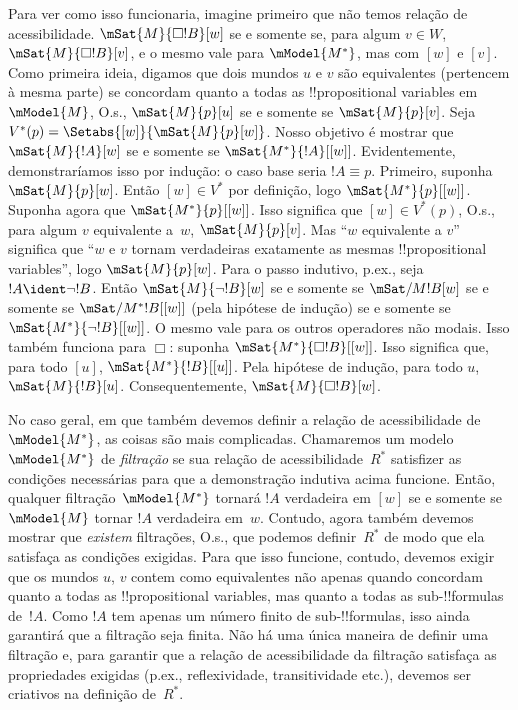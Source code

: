 \documentclass[../../../include/open-logic-section]{subfiles}
\begin{document}
Para ver como isso funcionaria, imagine primeiro que não temos relação
de acessibilidade. $\mSat{M}{\Box !B}[w]$ se e somente se, para algum
$v \in W$, $\mSat{M}{\Box !B}[v]$, e o mesmo vale para
$\mModel{M^*}$, mas com $[w]$ e $[v]$. Como primeira ideia, digamos que
dois mundos $u$ e $v$ são equivalentes (pertencem à mesma parte) se
concordam quanto a todas as !!{propositional variable}s em~$\mModel{M}$,
O.s.\@, $\mSat{M}{p}[u]$ se e somente se $\mSat{M}{p}[v]$. Seja
$V^*(p) = \Setabs{[w]}{\mSat{M}{p}[w]}$. Nosso objetivo é mostrar que
$\mSat{M}{!A}[w]$ se e somente se $\mSat{M^*}{!A}[{[w]}]$.
Evidentemente, demonstraríamos isso por indução: o caso base seria
$!A \equiv p$. Primeiro, suponha $\mSat{M}{p}[w]$. Então
$[w] \in V^*$ por definição, logo $\mSat{M^*}{p}[{[w]}]$. Suponha
agora que $\mSat{M^*}{p}[{[w]}]$. Isso significa que
$[w] \in V^*(p)$, O.s.\@, para algum $v$ equivalente a~$w$,
$\mSat{M}{p}[v]$. Mas ``$w$ equivalente a $v$'' significa que ``$w$ e
$v$ tornam verdadeiras exatamente as mesmas !!{propositional variable}s'',
logo $\mSat{M}{p}[w]$. Para o passo indutivo, p.ex., seja
$!A \ident \lnot !B$. Então $\mSat{M}{\lnot !B}[w]$ se e somente se
$\mSat/{M}{!B}[w]$ se e somente se $\mSat/{M^*}{!B}[{[w]}]$ (pela
hipótese de indução) se e somente se $\mSat{M^*}{\lnot !B}[{[w]}]$.
O mesmo vale para os outros operadores não modais. Isso também
funciona para $\Box$: suponha $\mSat{M^*}{\Box !B}[{[w]}]$. Isso
significa que, para todo $[u]$, $\mSat{M^*}{!B}[{[u]}]$. Pela hipótese
de indução, para todo $u$, $\mSat{M}{!B}[u]$. Consequentemente,
$\mSat{M}{\Box !B}[w]$.

No caso geral, em que também devemos definir a relação de
acessibilidade de $\mModel{M^*}$, as coisas são mais complicadas.
Chamaremos um modelo~$\mModel{M^*}$ de \emph{filtração} se sua relação
de acessibilidade~$R^*$ satisfizer as condições necessárias para que a
demonstração indutiva acima funcione. Então, qualquer
filtração~$\mModel{M^*}$ tornará $!A$ verdadeira em $[w]$ se e somente
se $\mModel{M}$ tornar $!A$ verdadeira em~$w$. Contudo, agora também
devemos mostrar que \emph{existem} filtrações, O.s.\@, que podemos
definir~$R^*$ de modo que ela satisfaça as condições exigidas. Para que
isso funcione, contudo, devemos exigir que os mundos $u$, $v$ contem
como equivalentes não apenas quando concordam quanto a todas as
!!{propositional variable}s, mas quanto a todas as sub-!!{formula}s
de~$!A$. Como $!A$ tem apenas um número finito de sub-!!{formula}s,
isso ainda garantirá que a filtração seja finita. Não há uma única
maneira de definir uma filtração e, para garantir que a relação de
acessibilidade da filtração satisfaça as propriedades exigidas (p.ex., reflexividade, transitividade etc.), devemos ser criativos na
definição de~$R^*$.
\end{document}
